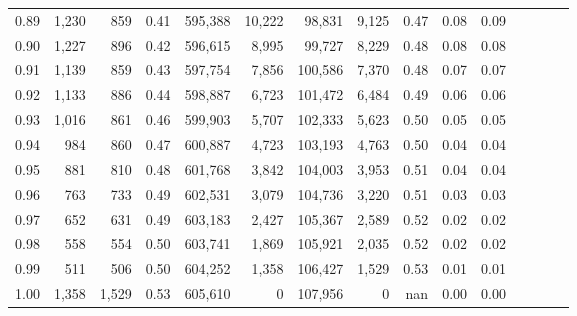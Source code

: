 \begin{tabular}{rrrcrrrrrrrrrrr}
0.89 &   1,230 &    859 &                                       0.41 &  595,388 &   10,222 &   98,831 &    9,125 &  0.47 &  0.08 &                         0.09 \\
0.90 &   1,227 &    896 &                                       0.42 &  596,615 &    8,995 &   99,727 &    8,229 &  0.48 &  0.08 &                         0.08 \\
0.91 &   1,139 &    859 &                                       0.43 &  597,754 &    7,856 &  100,586 &    7,370 &  0.48 &  0.07 &                         0.07 \\
0.92 &   1,133 &    886 &                                       0.44 &  598,887 &    6,723 &  101,472 &    6,484 &  0.49 &  0.06 &                         0.06 \\
0.93 &   1,016 &    861 &                                       0.46 &  599,903 &    5,707 &  102,333 &    5,623 &  0.50 &  0.05 &                         0.05 \\
0.94 &     984 &    860 &                                       0.47 &  600,887 &    4,723 &  103,193 &    4,763 &  0.50 &  0.04 &                         0.04 \\
0.95 &     881 &    810 &                                       0.48 &  601,768 &    3,842 &  104,003 &    3,953 &  0.51 &  0.04 &                         0.04 \\
0.96 &     763 &    733 &                                       0.49 &  602,531 &    3,079 &  104,736 &    3,220 &  0.51 &  0.03 &                         0.03 \\
0.97 &     652 &    631 &                                       0.49 &  603,183 &    2,427 &  105,367 &    2,589 &  0.52 &  0.02 &                         0.02 \\
0.98 &     558 &    554 &                                       0.50 &  603,741 &    1,869 &  105,921 &    2,035 &  0.52 &  0.02 &                         0.02 \\
0.99 &     511 &    506 &                                       0.50 &  604,252 &    1,358 &  106,427 &    1,529 &  0.53 &  0.01 &                         0.01 \\
1.00 &   1,358 &  1,529 &                                       0.53 &  605,610 &        0 &  107,956 &        0 &   nan &  0.00 &                         0.00 \\
\bottomrule
\end{tabular}
